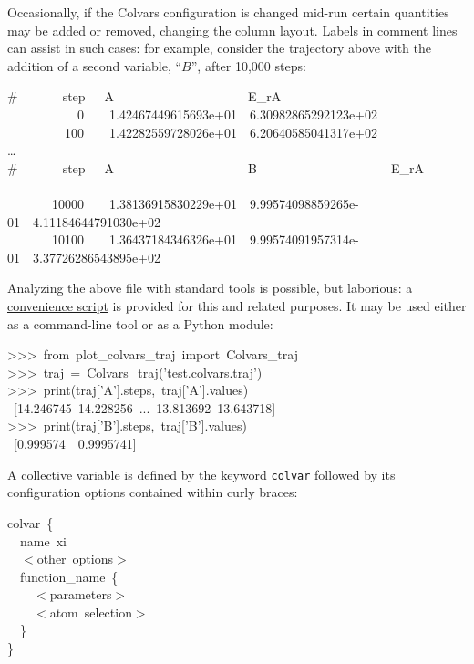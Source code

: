 Occasionally, if the Colvars configuration is changed mid-run certain quantities may be added or removed, changing the column layout.  Labels in comment lines can assist in such cases: for example, consider the trajectory above with the addition of a second variable, ``$B$'', after 10,000 steps:
\begin{datafileexample}
\-\#~~~~~~~step~~~A~~~~~~~~~~~~~~~~~~~~~E\_rA\\
\-~~~~~~~~~~~0~~~~1.42467449615693e+01~~6.30982865292123e+02\\
\-~~~~~~~~~100~~~~1.42282559728026e+01~~6.20640585041317e+02\\
\-\ldots\\
\-\#~~~~~~~step~~~A~~~~~~~~~~~~~~~~~~~~~B~~~~~~~~~~~~~~~~~~~~~E\_rA~~~~~~~~~~~~~~\\
\-~~~~~~~10000~~~~1.38136915830229e+01~~9.99574098859265e-01~~4.11184644791030e+02\\
\-~~~~~~~10100~~~~1.36437184346326e+01~~9.99574091957314e-01~~3.37726286543895e+02
\end{datafileexample}

Analyzing the above file with standard tools is possible, but laborious: a \href{https://github.com/Colvars/colvars/blob/master/colvartools/plot_colvars_traj.py?raw=true}{convenience script} is provided for this and related purposes.  It may be used either as a command-line tool or as a Python module:
\begin{mdexampleinput}
\->{}>{}>~from~plot\_colvars\_traj~import~Colvars\_traj\\
\->{}>{}>~traj~=~Colvars\_traj('test.colvars.traj')\\
\->{}>{}>~print(traj['A'].steps,~traj['A'].values)\\
\-[~~~~0~~~100~~...~~10000~10100]~[14.246745~14.228256~...~13.813692~13.643718]\\
\->{}>{}>~print(traj['B'].steps,~traj['B'].values)\\
\-[10000~10100]~[0.999574~~0.9995741]
\end{mdexampleinput}



A collective variable is defined by the keyword \texttt{colvar} followed by its configuration options contained within curly braces:

\begin{cvexampleinput}
\-colvar~\{\\
\-~~name~xi\\
\-~~$<$other~options$>$\\
\-~~function\_name~\{\\
\-~~~~$<$parameters$>$\\
\-~~~~$<$atom~selection$>$\\
\-~~\}\\
\}
\end{cvexampleinput}


